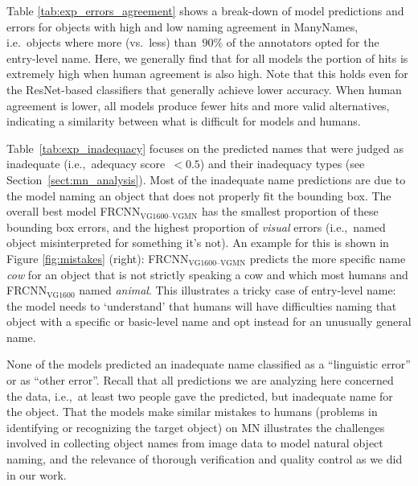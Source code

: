 Table \ref{tab:exp_errors_agreement} shows a break-down of model predictions and errors for objects with high and low naming agreement in ManyNames, i.e.\ objects where more (vs.\ less) than~$90\%$ of the annotators opted for the entry-level name. 
Here, we generally find that for all models the portion of hits is extremely high when human agreement is also high.
Note that this holds even for the ResNet-based classifiers that generally achieve lower accuracy.
When human agreement is lower, all models produce fewer hits and more valid alternatives, indicating a similarity between what is difficult for models and humans.

Table~\ref{tab:exp_inadequacy} focuses on the predicted \mn names that were judged as inadequate (i.e.,~adequacy score~\mbox{$<0.5$}) and their inadequacy types (see Section~\ref{sect:mn_analysis}).
Most of the inadequate name predictions are due to the model naming an object that does not properly fit the bounding box. 
The overall best model FRCNN$_{\text{VG1600--VGMN}}$ has the smallest proportion of these bounding box errors, and the highest proportion of \textit{visual} errors (i.e.,~named object misinterpreted for something it's not). 
An example for this is shown in Figure \ref{fig:mistakes} (right): FRCNN$_{\text{VG1600--VGMN}}$ predicts the more specific name \textit{cow} for an object that is not strictly speaking a cow and which most humans and FRCNN$_{\text{VG1600}}$ named \textit{animal}.
This illustrates a tricky case of entry-level name: the model needs to `understand' that humans will have difficulties naming that object with a specific or basic-level name and opt instead for an unusually general name.

%
None of the models predicted an inadequate name classified as a ``linguistic error'' or as ``other error''.
Recall that all predictions we are analyzing here concerned the \mn data, i.e.,~at least two people gave the predicted, but inadequate name for the object. 
That the models make similar mistakes to humans (problems in identifying or recognizing the target object) on MN illustrates the challenges involved in collecting object names from image data to model natural object naming, and the relevance of thorough verification and quality control as we did in our work.  


